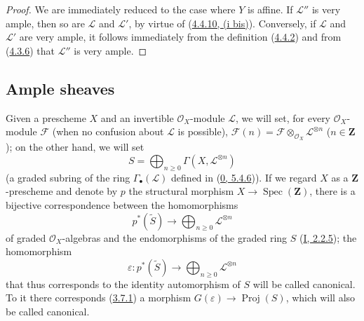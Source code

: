 \begin{proof}
We are immediately reduced to the case where $Y$ is affine. If $\mathcal{L}''$
is very ample, then so are $\mathcal{L}$ and $\mathcal{L}'$, by virtue of
(\hyperref[II.4.4.10]{4.4.10, (i bis)}). Conversely, if $\mathcal{L}$ and
$\mathcal{L}'$ are very ample, it follows immediately from the definition
(\hyperref[II.4.4.2]{4.4.2}) and from
(\hyperref[II.4.3.6]{4.3.6}) that $\mathcal{L}''$ is very ample.
\end{proof}


\subsection{Ample sheaves}
\label{subsection:II.4.5}

\begin{env}[4.5.1]
\label{II.4.5.1}
Given a prescheme $X$ and an invertible $\mathcal{O}_X$-module
$\mathcal{L}$, we will set, for every $\mathcal{O}_X$-module $\mathcal{F}$
(when no confusion about $\mathcal{L}$ is possible),
$\mathcal{F}(n)=\mathcal{F}\otimes_{\mathcal{O}_X}\mathcal{L}^{\otimes n}$
($n\in\mathbf{Z}$); on the other hand, we will set
\[
  S=\bigoplus_{n\geq0}\Gamma(X,\mathcal{L}^{\otimes n})
\]
(a graded subring of the ring $\Gamma_\bullet(\mathcal{L})$ defined in
(\hyperref[0.5.4.6]{0, 5.4.6})). If we regard $X$ as a
$\mathbf{Z}$-prescheme and denote by $p$ the structural morphism
$X\to\operatorname{Spec}(\mathbf{Z})$, there is a bijective correspondence
between the homomorphisms
\[
  p^*(\widetilde{S})\longrightarrow
  \bigoplus_{n\geq0}\mathcal{L}^{\otimes n}
\]
of graded $\mathcal{O}_X$-algebras and the endomorphisms of the graded ring
$S$ (\hyperref[I.2.2.5]{I, 2.2.5}); the homomorphism
\[
  \varepsilon:p^*(\widetilde{S})\longrightarrow
  \bigoplus_{n\geq0}\mathcal{L}^{\otimes n}
\]
that thus corresponds to the identity automorphism of $S$ will be called
canonical. To it there corresponds (\hyperref[II.3.7.1]{3.7.1}) a morphism
$G(\varepsilon)\to\operatorname{Proj}(S)$, which will also be called canonical.
\end{env}

